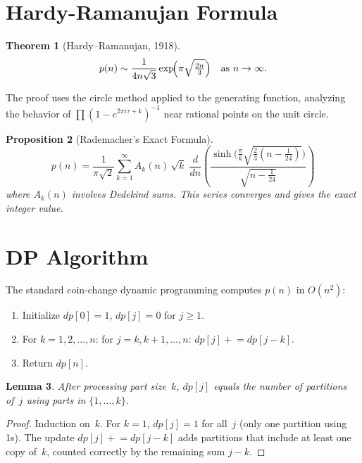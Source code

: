 \documentclass[11pt]{article}
\newtheorem{theorem}{Theorem}
\newtheorem{lemma}[theorem]{Lemma}
\newtheorem{proposition}[theorem]{Proposition}
\begin{document}
\section{Hardy-Ramanujan Formula}

\begin{theorem}[Hardy--Ramanujan, 1918]
\[
p(n) \sim \frac{1}{4n\sqrt{3}} \exp\!\Bigl(\pi\sqrt{\tfrac{2n}{3}}\Bigr) \quad \text{as } n \to \infty.
\]
\end{theorem}

The proof uses the circle method applied to the generating function, analyzing the behavior of $\prod (1-e^{2\pi i \tau + k})^{-1}$ near rational points on the unit circle.

\begin{proposition}[Rademacher's Exact Formula]
\[
p(n) = \frac{1}{\pi\sqrt{2}} \sum_{k=1}^{\infty} A_k(n)\,\sqrt{k}\;\frac{d}{dn}\!\left(\frac{\sinh\!\bigl(\frac{\pi}{k}\sqrt{\frac{2}{3}(n-\frac{1}{24})}\bigr)}{\sqrt{n - \frac{1}{24}}}\right)
\]
where $A_k(n)$ involves Dedekind sums. This series converges and gives the exact integer value.
\end{proposition}

\section{DP Algorithm}

The standard coin-change dynamic programming computes $p(n)$ in $O(n^2)$:

\begin{enumerate}
\item Initialize $dp[0] = 1$, $dp[j] = 0$ for $j \ge 1$.
\item For $k = 1, 2, \ldots, n$: for $j = k, k+1, \ldots, n$: $dp[j] \mathrel{+}= dp[j-k]$.
\item Return $dp[n]$.
\end{enumerate}

\begin{lemma}
After processing part size~$k$, $dp[j]$ equals the number of partitions of~$j$ using parts in $\{1, \ldots, k\}$.
\end{lemma}

\begin{proof}
Induction on~$k$. For $k=1$, $dp[j] = 1$ for all~$j$ (only one partition using 1s). The update $dp[j] \mathrel{+}= dp[j-k]$ adds partitions that include at least one copy of~$k$, counted correctly by the remaining sum $j-k$.
\end{proof}
\end{document}
